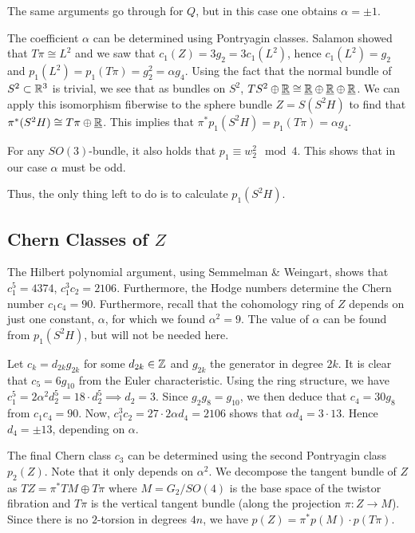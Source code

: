 \documentclass{scrartcl}
\begin{document}
\begin{rem}
	The same arguments go through for $Q$, but in this case one obtains $\alpha=\pm 1$.
\end{rem}

The coefficient $\alpha$ can be determined using Pontryagin classes. Salamon showed that $T\pi\cong L^2$ and we saw that $c_1(Z)=3g_2=3c_1(L^2)$, hence $c_1(L^2)=g_2$ and $p_1(L^2)=p_1(T\pi)=g_2^2=\alpha g_4$. Using the fact that the normal bundle of $S^2\subset \mathbb{R}^3$ is trivial, we see that as bundles on $S^2$, $TS^2\oplus \underline {\mathbb{R}}\cong \underline {\mathbb{R}}\oplus\underline {\mathbb{R}}\oplus\underline {\mathbb{R}}$. We can apply this isomorphism fiberwise to the sphere bundle $Z=S(S^2H)$ to find that $\pi^*(S^2H)\cong T\pi\oplus \underline {\mathbb{R}}$. This implies that $\pi^*p_1(S^2H)=p_1(T\pi)=\alpha g_4$. 

\begin{rem}
	For any $SO(3)$-bundle, it also holds that $p_1\equiv w_2^2\mod 4$. This shows that in our case $\alpha$ must be odd.
\end{rem}

Thus, the only thing left to do is to calculate $p_1(S^2H)$.


\subsection{Chern Classes of $Z$}

The Hilbert polynomial argument, using Semmelman \& Weingart, shows that $c_1^5=4374$, $c_1^3c_2=2106$. Furthermore, the Hodge numbers determine the Chern number $c_1c_4=90$. Furthermore, recall that the cohomology ring of $Z$ depends on just one constant, $\alpha$, for which we found $\alpha^2=9$. The value of $\alpha$ can be found from $p_1(S^2H)$, but will not be needed here. 

\medskip

Let $c_k=d_{2k}g_{2k}$ for some $d_{2k}\in \mathbb{Z}$ and $g_{2k}$ the generator in degree $2k$. It is clear that $c_5=6g_{10}$ from the Euler characteristic. Using the ring structure, we have $c_1^5=2\alpha^2d_2^5=18\cdot d_2^5\implies d_2=3$. Since $g_2g_8=g_{10}$, we then deduce that $c_4=30g_8$ from $c_1c_4=90$. Now, $c_1^3c_2=27\cdot 2\alpha d_4=2106$ shows that $\alpha d_4=3\cdot 13$. Hence $d_4=\pm 13$, depending on $\alpha$. 

\medskip

The final Chern class $c_3$ can be determined using the second Pontryagin class $p_2(Z)$. Note that it only depends on $\alpha^2$. We decompose the tangent bundle of $Z$ as $TZ=\pi^*TM\oplus T\pi$ where $M=G_2/SO(4)$ is the base space of the twistor fibration and $T\pi$ is the vertical tangent bundle (along the projection $\pi:Z\to M$). Since there is no $2$-torsion in degrees $4n$, we have $p(Z)=\pi^*p(M) \cdot p(T\pi)$. 
\end{document}
